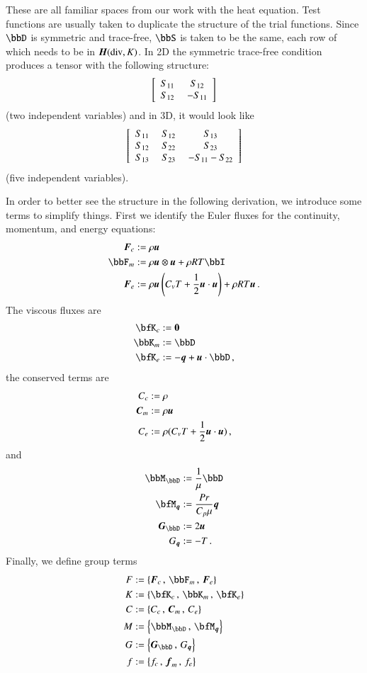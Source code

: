 \documentclass[preprint,12pt]{elsarticle}
\begin{document}
These are all familiar spaces from our work with the heat equation.
Test functions are usually taken to duplicate the structure of the trial functions.
Since $\bbD$ is symmetric and trace-free, $\bbS$ is taken to be the same, each row of which needs to be in $\mbox{\boldmath $H$}(\text{div},K)$.
In 2D the symmetric trace-free condition produces a tensor with the following structure:
\begin{equation*}
\left[ \begin{array}{cc} S_{11}\; & S_{12}\\ S_{12}\; & -S_{11}\\ \end{array} \right]
\end{equation*}
(two independent variables) and in 3D, it would look like
\begin{equation*}
\left[ \begin{array}{ccc} S_{11}\; & S_{12}\; & S_{13}\\ S_{12}\; & S_{22}\; & S_{23}\\ S_{13}\; & S_{23}\; & -S_{11}-S_{22}\\ \end{array} \right]
\end{equation*}
(five independent variables).

In order to better see the structure in the following derivation, we introduce some terms to simplify things.
First we identify the Euler fluxes for the continuity, momentum, and energy equations:
\begin{align*}
\bfF_c&:=\rho\bfu\\
\bbF_m&:=\rho\bfu\otimes\bfu+\rho RT\bbI\\
\bfF_e&:=\rho\bfu\LRp{C_v T+\frac{1}{2}\bfu\cdot\bfu}+\rho RT\bfu\,.
\end{align*}
The viscous fluxes are
\begin{align*}
\bfK_c&:=\boldsymbol 0\\
\bbK_m&:=\bbD\\
\bfK_e&:=-\bfq+\bfu\cdot\bbD\,,
\end{align*}
the conserved terms are
\begin{align*}
C_c&:=\rho\\
\boldsymbol C_m&:=\rho\boldsymbol u\\
C_e&:=\rho(C_v T+\frac{1}{2}\boldsymbol u\cdot\boldsymbol u)\,,
\end{align*}
and 
\begin{align*}
\bbM_{\bbD}&:=\frac{1}{\mu}\bbD\\
\bfM_{\bfq}&:=\frac{Pr}{C_p\mu}\bfq\\
\bfG_{\bbD}&:=2\bfu\\
G_{\bfq}&:=-T\,.
\end{align*}
Finally, we define group terms
\begin{align*}
F&:=\LRc{\bfF_c\,,\, \bbF_m\,,\, \bfF_e}\\
K&:=\LRc{\bfK_c\,,\, \bbK_m\,,\, \bfK_e}\\
C&:=\LRc{C_c\,,\, \bfC_m\,,\, C_e}\\
M&:=\LRc{\bbM_{\bbD}\,,\, \bfM_{\bfq}}\\
G&:=\LRc{\bfG_{\bbD}\,,\, G_{\bfq}}\\
f&:=\LRc{f_c\,,\, \bff_m\,,\, f_e}\\
\end{align*}
\end{document}
